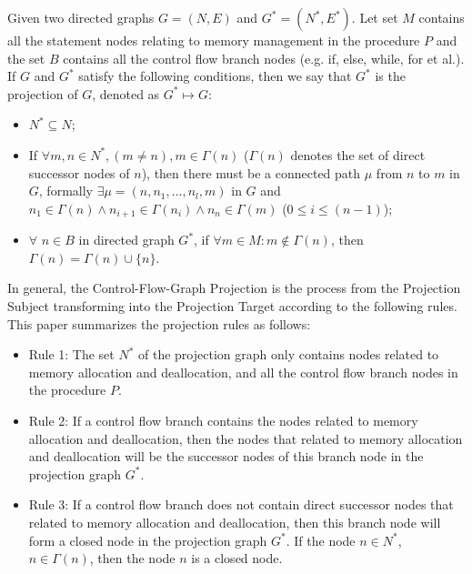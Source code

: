 \begin{definition}
Given two directed graphs $G = (N, E)$ and $G^* = (N^*, E^*)$. Let set $M$ contains all the statement nodes relating to memory management in the procedure $P$ and the set $B$ contains all the control flow branch nodes (e.g. {\sf if}, {\sf else}, {\sf while}, {\sf for} et al.). If $G$ and $G^*$ satisfy the following conditions, then we say that $G^*$ is the projection of $G$, denoted as $G^* \mapsto G$:
\begin{itemize}
\item
$N^*\subseteq N$;
\item
If $\forall m,n\in N^*,(m\neq n), m\in \Gamma(n)$ ($\Gamma(n)$ denotes the set of direct successor nodes of $n$), then there must be a connected path $\mu$ from $n$ to $m$ in $G$, formally $\exists \mu=(n, n_1,\ldots,n_l,m)$ in $G$ and $n_1\in\Gamma(n) \land  n_{i+1}\in\Gamma(n_i) \land n_n\in \Gamma(m)$ ($0\leq i\leq (n-1)$);
\item
$\forall$ $n\in B$ in directed graph $G^*$, if $\forall m\in M: m\not\in \Gamma(n)$, then $\Gamma(n)=\Gamma(n)\cup\{n\}$. 
\end{itemize}
\end{definition}

In general, the Control-Flow-Graph Projection is the process from the Projection Subject transforming into the Projection Target according to the following rules. This paper summarizes the projection rules as follows: 
\begin{itemize}
\item 
Rule 1: The set $N^*$ of the projection graph only contains nodes related to memory allocation and deallocation, and all the control flow branch nodes in the procedure $P$.
\item
Rule 2: If a control flow branch contains the nodes related to memory allocation and deallocation, then the nodes that related to memory allocation and deallocation will be the successor nodes of this branch node in the projection graph $G^*$.
\item
Rule 3: If a control flow branch does not contain direct successor nodes that related to memory allocation and deallocation, then this branch node will form a closed node in the projection graph $G^*$. 
If the node $n\in N^*$, $n\in \Gamma(n)$, then the node $n$ is a closed node.
\end{itemize}




